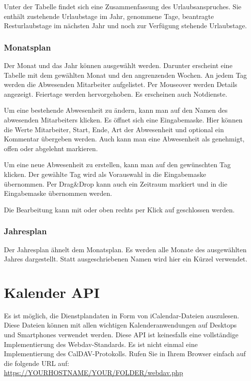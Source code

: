 Unter der Tabelle findet sich eine Zusammenfassung des Urlaubsanspruches. Sie enthält zustehende Urlaubstage im Jahr, genommene Tage, beantragte Resturlaubstage im nächsten Jahr und noch zur Verfügung stehende Urlaubstage.

\subsubsection{Monatsplan}
Der Monat und das Jahr können ausgewählt werden. Darunter erscheint eine Tabelle mit dem gewählten Monat und den angrenzenden Wochen.
An jedem Tag werden die Abwesenden Mitarbeiter aufgelistet. Per Mouseover werden Details angezeigt.
Feiertage werden hervorgehoben. Es erscheinen auch Notdienste.

Um eine bestehende Abwesenheit zu ändern, kann man auf den Namen des abwesenden Mitarbeiters klicken. Es öffnet sich eine Eingabemaske. Hier können die Werte Mitarbeiter, Start, Ende, Art der Abwesenheit und optional ein Kommentar übergeben werden. Auch kann man eine Abwesenheit als genehmigt, offen oder abgelehnt markieren.

Um eine neue Abwesenheit zu erstellen, kann man auf den gewünschten Tag klicken. Der gewählte Tag wird als Vorauswahl in die Eingabemaske übernommen. Per Drag\&Drop kann auch ein Zeitraum markiert und in die Eingabemaske übernommen werden.

Die Bearbeitung kann mit \keys{\esc} oder oben rechts per Klick auf  geschlossen werden.

\subsubsection{Jahresplan}
Der Jahresplan ähnelt dem Monatsplan. Es werden alle Monate des ausgewählten Jahres dargestellt. Statt ausgeschriebenen Namen wird hier ein Kürzel verwendet.

\section{Kalender API}\label{section-calendar-api}
Es ist möglich, die Dienstplandaten in Form von iCalendar-Dateien auszulesen. Diese Dateien können mit allen wichtigen Kalenderanwendungen auf Desktops und Smartphones verwendet werden. Diese API ist keinesfalls eine
vollständige Implementierung des Webdav-Standards. Es ist nicht einmal eine
Implementierung des CalDAV-Protokolls. Rufen Sie in Ihrem Browser einfach
auf die folgende URL auf: \url{https://YOURHOSTNAME/YOUR/FOLDER/webdav.php}


